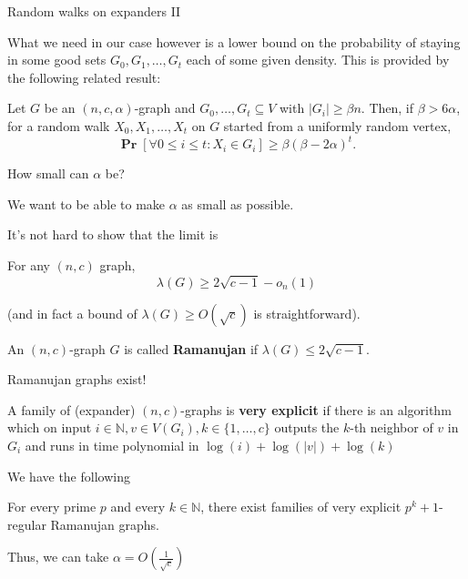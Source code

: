 \documentclass[10pt]{beamer}
\newcommand{\N}{\mathbb{N}}
\renewcommand{\P}{\operatorname*{\mathbf{Pr}}}
\renewcommand{\l}{\left}
\renewcommand{\r}{\right}
\renewcommand{\a}{\alpha}
\renewcommand{\b}{\beta}
\begin{document}
\begin{frame}{Random walks on expanders II}

  What we need in our case however is a lower bound on the probability
  of staying in some good sets $G_0,G_1,\ldots,G_t$ each of some given
  density. This is provided by the following related result:

  \bigskip\bigskip

  \begin{theorem} Let $G$ be an $(n,c,\a)$-graph and
    $G_0,\ldots,G_t\subseteq V$ with $|G_i|\geq \b n$. Then, if $\b>6\a$,
    for a random walk $X_0,X_1,\ldots,X_t$ on $G$ started from a
    uniformly random vertex,
    \[
    \P\l[\forall 0\leq i\leq t: X_i\in G_i\r]\geq \b(\b-2\a)^t.
    \]
  \end{theorem}

\end{frame}

\begin{frame}{How small can $\a$ be?}

  We want to be able to make $\a$ as small as possible.

  \pause\bigskip\bigskip

  It's not hard to show that the limit is
  \begin{theorem}
    For any $(n,c)$ graph,
    \[
    \lambda(G)\geq 2\sqrt{c-1}-o_n(1)
    \]
  \end{theorem}
  (and in fact a bound of $\lambda(G)\geq O(\sqrt{c})$ is
  straightforward).

  \pause\bigskip\bigskip

  \begin{definition}
    An $(n,c)$-graph $G$ is called \textbf{Ramanujan} if
    $\lambda(G)\leq 2\sqrt{c-1}$.
  \end{definition}
\end{frame}

\begin{frame}{Ramanujan graphs exist!}
  \begin{definition}
    A family of (expander) $(n,c)$-graphs is \textbf{very explicit} if
    there is an algorithm which on input $i\in\N,v\in
    V(G_i),k\in\{1,\ldots,c\}$ outputs the $k$-th neighbor of $v$ in
    $G_i$ and runs in time polynomial in $\log(i)+\log(|v|)+\log(k)$
  \end{definition}

  \pause\bigskip\bigskip

  We have the following
  \begin{theorem}
     For every prime $p$
    and every $k\in\N$, there exist families of very explicit
    $p^k+1$-regular Ramanujan graphs.
  \end{theorem}

  \pause\bigskip

  Thus, we can take $\a=O \l(\frac{1}{\sqrt{c}}\r)$
\end{frame}
\end{document}
